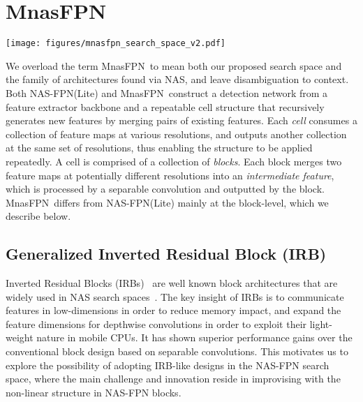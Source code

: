 \documentclass[10pt,twocolumn,letterpaper]{article}
\def\Mnasfpn{MnasFPN~}
\begin{document}
 

\section{\Mnasfpn}

\begin{figure*}[!t]
    \centering
    \texttt{[image: figures/mnasfpn\_search\_space\_v2.pdf]}
    \caption{A searchable \Mnasfpn block. \Mnasfpn re-introduces the Inverted Residual Block (IRB) into the NAS-FPN head (Sec.~\ref{sec:irb}). Any path connecting an input and a new feature, as highlighted in blue dashed rectangle, resembles an IRB. \Mnasfpn also employs Size Dependent Ordering (SDO) shown in black rectangle to re-order the resizing operation and the  convolution prior to feature merging (Sec.~\ref{sec:sdo}). Search-able components are highlighted in red (Sec.~\ref{sec:search_space}).}
\label{fig:search_space}
\end{figure*}

We overload the term \Mnasfpn to mean both our proposed search space and the family of architectures found via NAS, and leave disambiguation to context. Both NAS-FPN(Lite) and \Mnasfpn construct a detection network from a feature extractor backbone and a repeatable cell structure that recursively generates new features by merging pairs of existing features. Each {\it cell} consumes a collection of feature maps at various resolutions, and outputs another collection at the same set of resolutions, thus enabling the structure to be applied repeatedly. A cell is comprised of a collection of {\it blocks}. Each block merges two feature maps at potentially different resolutions into an {\it intermediate feature}, which is processed by a separable convolution and outputted by the block. \Mnasfpn differs from NAS-FPN(Lite) mainly at the block-level, which we describe below.


\subsection{Generalized Inverted Residual Block (IRB)}
\label{sec:irb}

Inverted Residual Blocks (IRBs)~\cite{sandler2018mobilenetv2} are well known block architectures that are widely used in NAS search spaces~\cite{tan2019mnasnet, cai2018proxylessnas, howard2019searching, wu2019fbnet}. The key insight of IRBs is to communicate features in low-dimensions in order to reduce memory impact, and expand the feature dimensions for depthwise convolutions in order to exploit their light-weight nature in mobile CPUs. It has shown superior performance gains over the conventional block design based on separable convolutions. This motivates us to explore the possibility of adopting IRB-like designs in the NAS-FPN search space, where the main challenge and innovation reside in improvising with the non-linear structure in NAS-FPN blocks.
\end{document}
